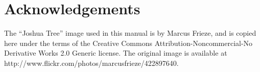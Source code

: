 \chapter{Acknowledgements}

The ``Joshua Tree'' image used in this manual is by Marcus Frieze, and is copied here under the terms of the Creative Commons Attribution-Noncommercial-No Derivative Works 2.0 Generic license. The original image is available at http://www.flickr.com/photos/marcusfrieze/422897640.


